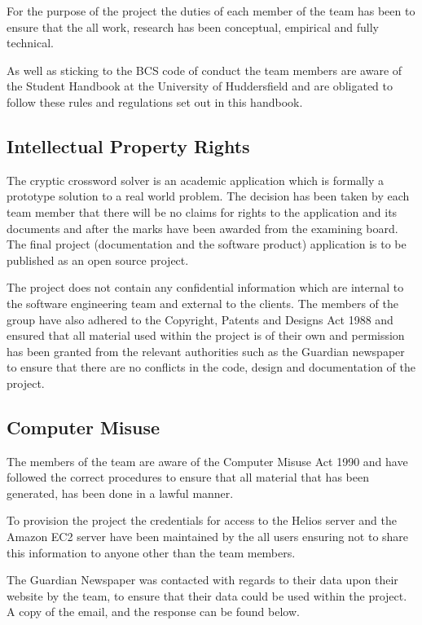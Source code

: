 \begin{flushright}
  {\footnotesize \citet{bcs14}}
\end{flushright}

For the purpose of the project the duties of each member of the team has been to
ensure that the all work, research has been conceptual, empirical and fully
technical.

As well as sticking to the BCS code of conduct the team members are aware of the
Student Handbook at the University of Huddersfield and are obligated to follow
these rules and regulations set out in this handbook.


\subsection{Intellectual Property Rights}

The cryptic crossword solver is an academic application which is formally a
prototype solution to a real world problem. The decision has been taken by each
team member that there will be no claims for rights to the application and its
documents and after the marks have been awarded from the examining board. The
final project (documentation and the software product) application is to be
published as an open source project.

The project does not contain any confidential information which are internal to
the software engineering team and external to the clients. The members of the
group have also adhered to the Copyright, Patents and Designs Act 1988 and
ensured that all material used within the project is of their own and permission
has been granted from the relevant authorities such as the Guardian newspaper to
ensure that there are no conflicts in the code, design and documentation of the
project.


\subsection{Computer Misuse}

The members of the team are aware of the Computer Misuse Act 1990 and have
followed the correct procedures to ensure that all material that has been
generated, has been done in a lawful manner.

To provision the project the credentials for access to the Helios server and the
Amazon EC2 server have been maintained by the all users ensuring not to share
this information to anyone other than the team members.


The Guardian Newspaper was contacted with regards to their data upon their 
website by the team, to ensure that their data could be used within the project.
A copy of the email, and the response can be found below.

